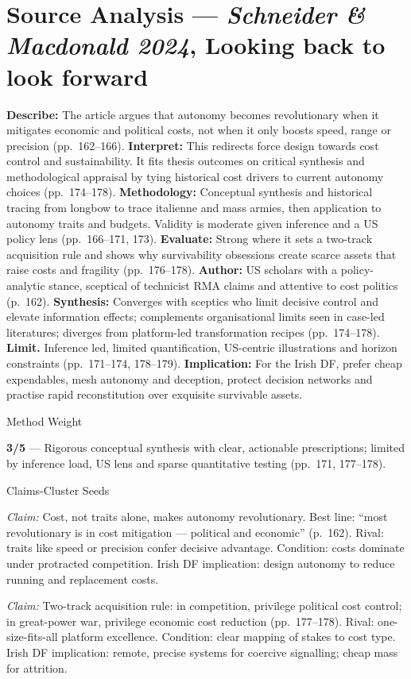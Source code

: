 \section*{Source Analysis — \textit{Schneider & Macdonald 2024}, Looking back to look forward}
\textbf{Describe:} The article argues that autonomy becomes revolutionary when it mitigates economic and political costs, not when it only boosts speed, range or precision (pp.~162–166).
\textbf{Interpret:} This redirects force design towards cost control and sustainability. It fits thesis outcomes on critical synthesis and methodological appraisal by tying historical cost drivers to current autonomy choices (pp.~174–178).
\textbf{Methodology:} Conceptual synthesis and historical tracing from longbow to trace italienne and mass armies, then application to autonomy traits and budgets. Validity is moderate given inference and a US policy lens (pp.~166–171, 173).
\textbf{Evaluate:} Strong where it sets a two-track acquisition rule and shows why survivability obsessions create scarce assets that raise costs and fragility (pp.~176–178).
\textbf{Author:} US scholars with a policy-analytic stance, sceptical of technicist RMA claims and attentive to cost politics (p.~162).
\textbf{Synthesis:} Converges with sceptics who limit decisive control and elevate information effects; complements organisational limits seen in case-led literatures; diverges from platform-led transformation recipes (pp.~174–178).
\textbf{Limit.} Inference led, limited quantification, US-centric illustrations and horizon constraints (pp.~171–174, 178–179).
\textbf{Implication:} For the Irish DF, prefer cheap expendables, mesh autonomy and deception, protect decision networks and practise rapid reconstitution over exquisite survivable assets.

Method Weight

\textbf{3/5} — Rigorous conceptual synthesis with clear, actionable prescriptions; limited by inference load, US lens and sparse quantitative testing (pp.~171, 177–178).

Claims-Cluster Seeds

\textit{Claim:} Cost, not traits alone, makes autonomy revolutionary. Best line: “most revolutionary is in cost mitigation — political and economic” (p.~162). Rival: traits like speed or precision confer decisive advantage. Condition: costs dominate under protracted competition. Irish DF implication: design autonomy to reduce running and replacement costs.

\textit{Claim:} Two-track acquisition rule: in competition, privilege political cost control; in great-power war, privilege economic cost reduction (pp.~177–178). Rival: one-size-fits-all platform excellence. Condition: clear mapping of stakes to cost type. Irish DF implication: remote, precise systems for coercive signalling; cheap mass for attrition.


